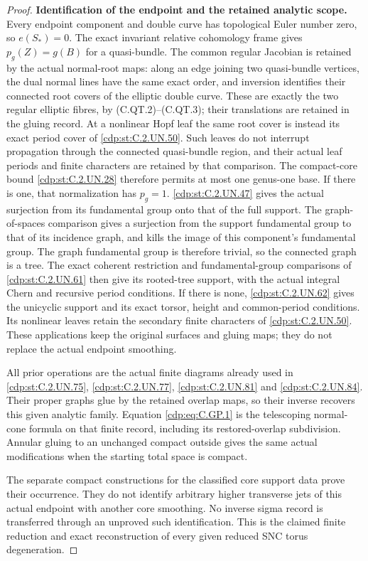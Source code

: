 \begin{proof}
\par\medskip\noindent\textbf{Identification of the endpoint and the retained analytic scope.}
Every endpoint component and double curve
has topological Euler number zero, so
\(e(S_*)=0\). The exact invariant relative
cohomology frame gives
\(p_g(Z)=g(B)\) for a quasi-bundle. The
common regular Jacobian is retained by
the actual normal-root maps: along an
edge joining two quasi-bundle vertices,
the dual normal lines have the same
exact order, and inversion identifies
their connected root covers of the
elliptic double curve. These are exactly
the two regular elliptic fibres, by
(C.QT.2)--(C.QT.3); their translations
are retained in the gluing record.
At a nonlinear Hopf leaf the same root
cover is instead its exact period cover
of \ref{cdp:st:C.2.UN.50}. Such leaves do not interrupt
propagation through the connected
quasi-bundle region, and their actual
leaf periods and finite characters are
retained by that comparison.
The
compact-core bound \ref{cdp:st:C.2.UN.28} therefore permits
at most one genus-one base. If there is
one, that normalization has \(p_g=1\).
\ref{cdp:st:C.2.UN.47} gives the actual surjection from its
fundamental group onto that of the full
support. The graph-of-spaces comparison
gives a surjection from the support
fundamental group to that of its incidence
graph, and kills the image of this
component's fundamental group.
The graph fundamental group is therefore
trivial, so the connected graph is a tree.
The exact coherent restriction and
fundamental-group comparisons of \ref{cdp:st:C.2.UN.61}
then give its rooted-tree support, with the
actual integral Chern and recursive
period conditions. If there is none,
\ref{cdp:st:C.2.UN.62} gives the unicyclic support and
its exact torsor, height and common-period
conditions. Its nonlinear leaves retain
the secondary finite characters of \ref{cdp:st:C.2.UN.50}.
These applications keep the original
surfaces and gluing maps; they do not
replace the actual endpoint smoothing.

All prior operations are the actual
finite diagrams already used in \ref{cdp:st:C.2.UN.75},
\ref{cdp:st:C.2.UN.77}, \ref{cdp:st:C.2.UN.81} and \ref{cdp:st:C.2.UN.84}. Their proper graphs
glue by the retained overlap maps, so
their inverse recovers this given
analytic family. Equation \eqref{cdp:eq:C.GP.1}
is the telescoping normal-cone formula
on that finite record, including its
restored-overlap subdivision. Annular
gluing to an unchanged compact outside
gives the same actual modifications
when the starting total space is compact.

The separate compact constructions for
the classified core support data prove
their occurrence. They do not identify
arbitrary higher transverse jets of
this actual endpoint with another core
smoothing. No inverse sigma record is
transferred through an unproved such
identification. This is the claimed
finite reduction and exact reconstruction
of every given reduced SNC torus
degeneration.
\end{proof}


